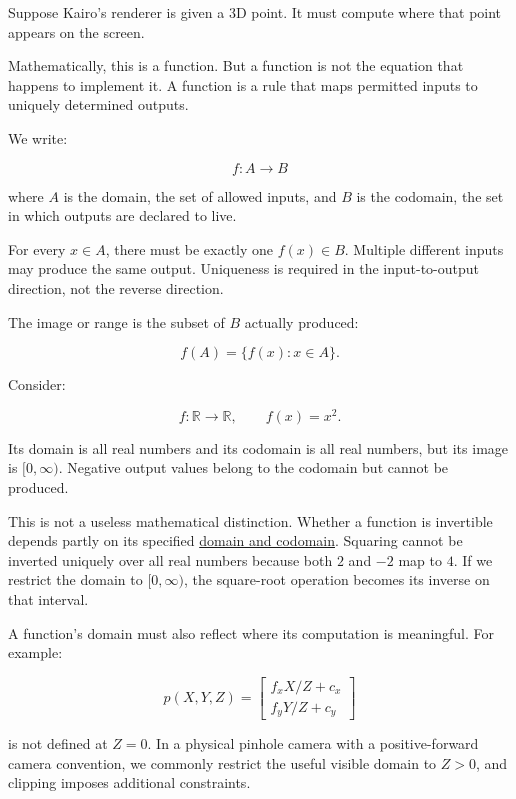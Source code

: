 \hypertarget{01-foundations-i-ch020-functions-are-mappings-not-merely-equations}{}

Suppose Kairo's renderer is given a 3D point. It must compute where that point appears on the screen.

Mathematically, this is a function. But a function is not the equation that happens to implement it. A function is a rule that maps permitted inputs to uniquely determined outputs.

We write:

\[
f:A\rightarrow B
\]

where \(A\) is the domain, the set of allowed inputs, and \(B\) is the codomain, the set in which outputs are declared to live.

For every \(x\in A\), there must be exactly one \(f(x)\in B\). Multiple different inputs may produce the same output. Uniqueness is required in the input-to-output direction, not the reverse direction.

The image or range is the subset of \(B\) actually produced:

\[
f(A)=\{f(x):x\in A\}.
\]

Consider:

\[
f:\mathbb R\rightarrow\mathbb R,\qquad f(x)=x^2.
\]

Its domain is all real numbers and its codomain is all real numbers, but its image is \([0,\infty)\). Negative output values belong to the codomain but cannot be produced.

This is not a useless mathematical distinction. Whether a function is invertible depends partly on its specified \hyperref[01-foundations-i-ch020-functions-limits-continuity-and-scalar-change]{domain and codomain}. Squaring cannot be inverted uniquely over all real numbers because both \(2\) and \(-2\) map to \(4\). If we restrict the domain to \([0,\infty)\), the square-root operation becomes its inverse on that interval.

A function's domain must also reflect where its computation is meaningful. For example:

\[
p(X,Y,Z)= \begin{bmatrix} f_xX/Z+c_x\\ f_yY/Z+c_y \end{bmatrix}
\]

is not defined at \(Z=0\). In a physical pinhole camera with a positive-forward camera convention, we commonly restrict the useful visible domain to \(Z>0\), and clipping imposes additional constraints.

